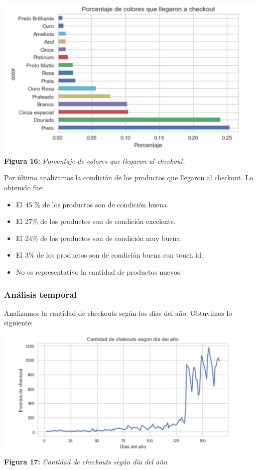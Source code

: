 \documentclass[titlepage,a4paper]{article}
\begin{document}
	\begin{center}
	\includegraphics[width=15cm] {porcentajeDeColoresQueLlegaronACheck.jpg}\\
	\textbf{Figura 16:}  \textit{Porcentaje de colores que llegaron al checkout.}
	\end{center}
	Por último analizamos la condición de los productos que llegaron al checkout. Lo obtenido fue:
	\begin{itemize}
	\item El 45 \% de los productos son de condición buena. 
	\item El 27\% de los productos son de condición excelente.
	\item El 24\% de los productos son de condición muy buena. 
	\item El 3\% de los productos son de condición buena con touch id. 
	\item No es representativo la cantidad de productos nuevos. 
	\end{itemize}
	\subsubsection{Análisis temporal}
	Analizamos la cantidad de checkouts según los días del año. Obtuvimos lo siguiente:
	\begin{center}
	\includegraphics[width=13cm] {cantidadDeCheckoutsSegunDiaDelAnio.jpg}\\
	\textbf{Figura 17:}  \textit{Cantidad de checkouts según día del año.}
	\end{center}
\end{document}
